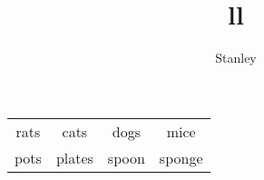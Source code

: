 \documentclass[10pt,a4paper]{article}
\author{Stanley}
\title{ll}
\begin{document}
\begin{table}[h!]
\begin{tabular}{|c c c c|}
\hline
rats & cats & dogs & mice\\
\cline{2-4}
pots & plates & spoon & sponge\\
\hline
\end{tabular}
\end{table}
\begin{theorem}

\end{theorem}
\end{document}
